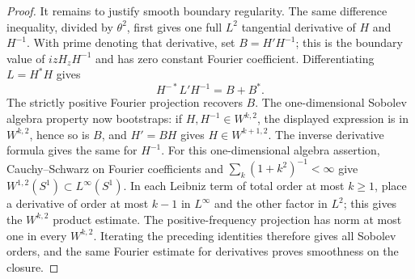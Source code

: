 \documentclass[11pt]{article}
\theoremstyle{definition}
\theoremstyle{remark}
\numberwithin{equation}{section}
\begin{document}
\begin{proof}
It remains to justify smooth boundary regularity.  The same difference
inequality, divided by $\theta^2$, first gives one full $L^2$
tangential derivative of $H$ and $H^{-1}$.  With prime denoting that
derivative, set $B=H'H^{-1}$; this is the boundary value of
$izH_zH^{-1}$ and has zero constant Fourier coefficient.  Differentiating
$L=H^*H$ gives
\[
 H^{-*}L'H^{-1}=B+B^*.
\]
The strictly positive Fourier projection recovers $B$.  The
one-dimensional Sobolev algebra property now bootstraps: if
$H,H^{-1}\in W^{k,2}$, the displayed expression is in $W^{k,2}$,
hence so is $B$, and $H'=BH$ gives $H\in W^{k+1,2}$.
The inverse derivative formula gives the same for $H^{-1}$.
For this one-dimensional algebra assertion, Cauchy--Schwarz on
Fourier coefficients and $\sum_k(1+k^2)^{-1}<\infty$ give
$W^{1,2}(S^1)\subset L^\infty(S^1)$.  In each Leibniz term of total
order at most $k\ge1$, place a derivative of order at most $k-1$
in $L^\infty$ and the other factor in $L^2$; this gives the
$W^{k,2}$ product estimate.  The positive-frequency projection has
norm at most one in every $W^{k,2}$.  Iterating the preceding
identities therefore gives all Sobolev orders, and the same Fourier
estimate for derivatives proves smoothness on the closure.
\end{proof}
\end{document}
